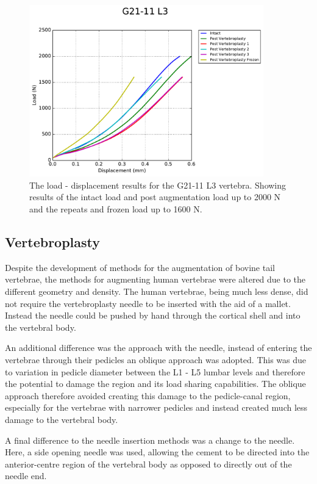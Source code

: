 \begin{figure}[H]
\centering
\includegraphics[width=4in]{Chapters/Chapter_HT_images/G21-11_L3.pdf}
\caption{The load - displacement results for the G21-11 L3 vertebra. Showing results of the intact load and post augmentation load up to 2000 N and the repeats and frozen load up to 1600 N.}
\label{fig:G21-11_L3}
\end{figure}






\subsection{Vertebroplasty}

Despite the development of methods for the augmentation of bovine tail vertebrae, the methods for augmenting human vertebrae were altered due to the different geometry and density.
The human vertebrae, being much less dense, did not require the vertebroplasty needle to be inserted with the aid of a mallet.
Instead the needle could be pushed by hand through the cortical shell and into the vertebral body.

An additional difference was the approach with the needle, instead of entering the vertebrae through their pedicles an oblique approach was adopted.
This was due to variation in pedicle diameter between the L1 - L5 lumbar levels and therefore the potential to damage the region and its load sharing capabilities.
The oblique approach therefore avoided creating this damage to the pedicle-canal region, especially for the vertebrae with narrower pedicles and instead created much less damage to the vertebral body.

A final difference to the needle insertion methods was a change to the needle.
Here, a side opening needle was used, allowing the cement to be directed into the anterior-centre region of the vertebral body as opposed to directly out of the needle end.

